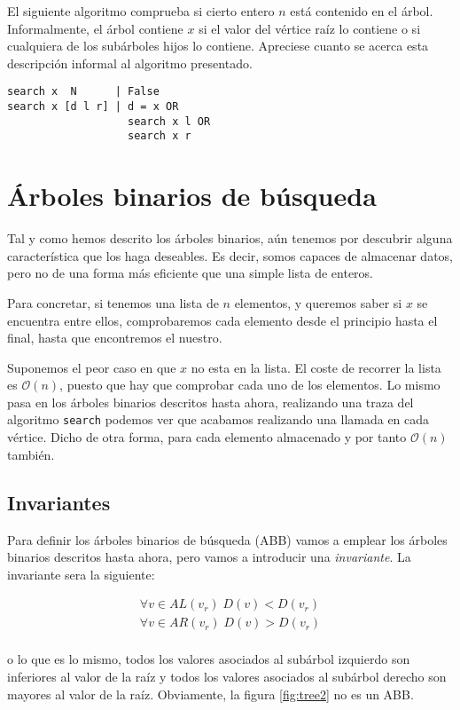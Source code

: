 \documentclass[10pt,spanish,twocolumn]{article}
\begin{document}
El siguiente algoritmo comprueba si cierto entero $n$ está contenido en el 
árbol.  Informalmente, el árbol contiene $x$ si el valor del vértice raíz lo 
contiene o si cualquiera de los subárboles hijos lo contiene.  Apreciese cuanto 
se acerca esta descripción informal al algoritmo presentado.

\begin{lstlisting}
search x  N      | False
search x [d l r] | d = x OR
                   search x l OR
                   search x r
\end{lstlisting}

\section{Árboles binarios de búsqueda}
Tal y como hemos descrito los árboles binarios, aún tenemos por descubrir 
alguna característica que los haga deseables.  Es decir, somos capaces de 
almacenar datos, pero no de una forma más eficiente que una simple lista de 
enteros.

Para concretar, si tenemos una lista de $n$ elementos, y queremos saber si $x$ 
se encuentra entre ellos, comprobaremos cada elemento desde el principio hasta 
el final, hasta que encontremos el nuestro.

Suponemos el peor caso en que $x$ no esta en la lista.  El coste de recorrer la 
lista es $\mathcal{O}(n)$, puesto que hay que comprobar cada uno de los 
elementos.  Lo mismo pasa en los árboles binarios descritos hasta ahora, 
realizando una traza del algoritmo \texttt{search} podemos ver que acabamos 
realizando una llamada en cada vértice.  Dicho de otra forma, para cada 
elemento almacenado y por tanto $\mathcal{O}(n)$ también.

\subsection{Invariantes}
Para definir los árboles binarios de búsqueda (ABB) vamos a emplear los árboles 
binarios descritos hasta ahora, pero vamos a introducir una \emph{invariante}.  
La invariante sera la siguiente:

\begin{align*}
    \forall v \in AL(v_r) \; D(v) < D(v_r)\\
    \forall v \in AR(v_r) \; D(v) > D(v_r)\\
\end{align*}

o lo que es lo mismo, todos los valores asociados al subárbol izquierdo son 
inferiores al valor de la raíz y todos los valores asociados al subárbol 
derecho son mayores al valor de la raíz.  Obviamente, la figura \ref{fig:tree2} 
no es un ABB.
\end{document}
